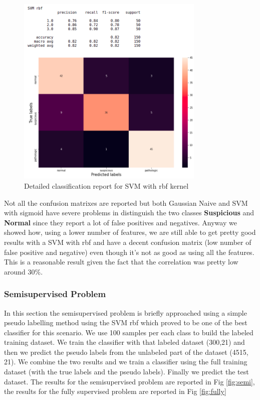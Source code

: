\documentclass[a4paper,12pt]{article}
\begin{document}
\begin{figure}[H]
  \begin{center}
  \includegraphics[width=0.8\textwidth]{images/svm_rbf_corr.png}
  \end{center}
  \caption{Detailed classification report for SVM with rbf kernel}
  \label{fig:poly}
\end{figure}

\noindent Not all the confusion matrixes are reported but both Gaussian Naive and SVM with sigmoid have severe problems in distinguish the two classes \textbf{Suspicious} and \textbf{Normal} since they report a lot of false positives and negatives. Anyway we showed how, using a lower number of features, we are still able to get pretty good results with a SVM with rbf and have a decent confusion matrix (low number of false positive and negative) even though it's not as good as using all the features. This is a reasonable result given the fact that the correlation was pretty low around 30\%.

\subsubsection{Semisupervised Problem}
In this section the semisupervised problem is briefly approached using a simple pseudo labelling method using the SVM rbf which proved to be one of the best classifier for this scenario. We use 100 samples per each class to build the labeled training dataset. We train the classifier with that labeled dataset (300,21) and then we predict the pseudo labels from the unlabeled part of the dataset (4515, 21). We combine the two results and we train a classifier using the full training dataset (with the true labels and the pseudo labels). Finally we predict the test dataset. The results for the semisupervised problem are reported in Fig \ref{fig:semi}, the results for the fully supervised problem are reported in Fig \ref{fig:fully}  
\end{document}
